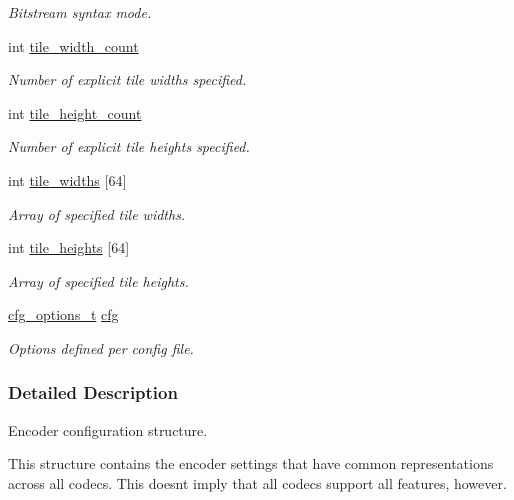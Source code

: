\begin{DoxyCompactItemize}
\begin{DoxyCompactList}\small\item\em Bitstream syntax mode. \end{DoxyCompactList}\item 
int \hyperlink{structaom__codec__enc__cfg_a1b1fc8284e9a26deb875b1b2a58e47d9}{tile\+\_\+width\+\_\+count}
\begin{DoxyCompactList}\small\item\em Number of explicit tile widths specified. \end{DoxyCompactList}\item 
int \hyperlink{structaom__codec__enc__cfg_aefb0569c7e68dd865067417145d39a0c}{tile\+\_\+height\+\_\+count}
\begin{DoxyCompactList}\small\item\em Number of explicit tile heights specified. \end{DoxyCompactList}\item 
int \hyperlink{structaom__codec__enc__cfg_ab03c0c96d42faaa8a3d697d4d283afcf}{tile\+\_\+widths} \mbox{[}64\mbox{]}
\begin{DoxyCompactList}\small\item\em Array of specified tile widths. \end{DoxyCompactList}\item 
int \hyperlink{structaom__codec__enc__cfg_a7859761b70f5a44005dfd776e7c2f79d}{tile\+\_\+heights} \mbox{[}64\mbox{]}
\begin{DoxyCompactList}\small\item\em Array of specified tile heights. \end{DoxyCompactList}\item 
\hyperlink{group__codec_ga58cddec4492c70945a2b4c3773c665b0}{cfg\+\_\+options\+\_\+t} \hyperlink{structaom__codec__enc__cfg_a91c4b8e91211a9cea98a8003ef2e4e65}{cfg}
\begin{DoxyCompactList}\small\item\em Options defined per config file. \end{DoxyCompactList}\end{DoxyCompactItemize}


\subsubsection{Detailed Description}
Encoder configuration structure. 

This structure contains the encoder settings that have common representations across all codecs. This doesn\textquotesingle{}t imply that all codecs support all features, however. 

